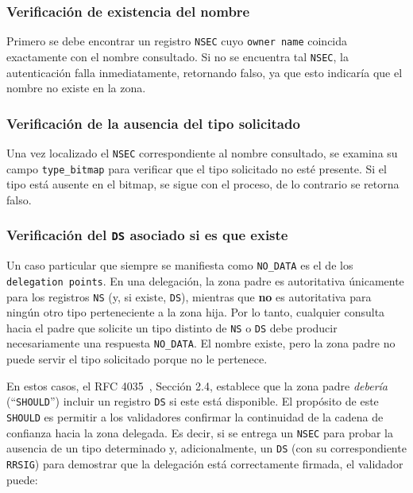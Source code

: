 \subsubsection{Verificación de existencia del nombre}

Primero se debe encontrar un registro \texttt{NSEC} cuyo \texttt{owner name} coincida exactamente con el nombre consultado. Si no se encuentra tal \texttt{NSEC}, 
la autenticación falla inmediatamente, retornando falso, ya que esto indicaría que el nombre no existe en la zona.

\subsubsection{Verificación de la ausencia del tipo solicitado}

Una vez localizado el \texttt{NSEC} correspondiente al nombre consultado, se examina su campo \texttt{type\_bitmap} para verificar que el tipo solicitado no esté presente.
Si el tipo está ausente en el bitmap, se sigue con el proceso, de lo contrario se retorna falso.

\subsubsection{Verificación del \texttt{DS} asociado si es que existe}

Un caso particular que siempre se manifiesta como \texttt{NO\_DATA} es el de los \texttt{delegation points}. En una delegación, la zona padre es autoritativa únicamente para los registros \texttt{NS} 
(y, si existe, \texttt{DS}), mientras que \textbf{no} es autoritativa para ningún otro tipo perteneciente a la zona hija. Por lo tanto, cualquier consulta hacia el padre que solicite un tipo distinto 
de \texttt{NS} o \texttt{DS} debe producir necesariamente una respuesta \texttt{NO\_DATA}. El nombre existe, pero la zona padre no puede servir el tipo solicitado porque no le pertenece.

En estos casos, el RFC 4035~\cite{RFC4035}, Sección 2.4, establece que la zona padre \emph{debería} (``\texttt{SHOULD}'') incluir un registro \texttt{DS} si este está disponible. El propósito de este 
\texttt{SHOULD} es permitir a los validadores confirmar la continuidad de la cadena de confianza hacia la zona delegada. Es decir, si se entrega un \texttt{NSEC} para probar la ausencia de un tipo 
determinado y, adicionalmente, un \texttt{DS} (con su correspondiente \texttt{RRSIG}) para demostrar que la delegación está correctamente firmada, el validador puede:

